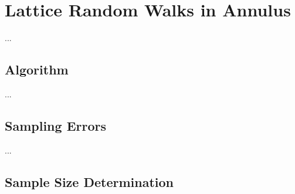 \section{Lattice Random Walks in Annulus}


...


\subsection{Algorithm}


...


\subsection{Sampling Errors}



...


\subsection{Sample Size Determination}


